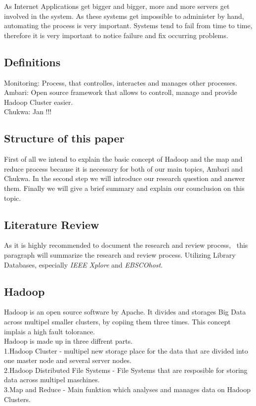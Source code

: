 As Internet Applications get bigger and bigger, more and more servers get involved in the system. As these systems get impossible to administer by hand, automating the process is very important. Systems tend to fail from time to time, therefore it is very important to notice failure and fix occurring problems.


\subsection{Definitions}
Monitoring: Process, that controlles, interactes and manages other processes.
\\
Ambari: Open source framework that allows to controll, manage and provide Hadoop Cluster easier.
\\
Chukwa: Jan !!!

\subsection{Structure of this paper}
First of all we intend to explain the basic concept of Hadoop and  the map and reduce process because it is necessary for both of our main topics, Ambari and Chukwa. In the second step we will introduce our research question and answer them. Finally we will give a brief summary and explain our counclusion on this topic.

\subsection{Literature Review}
	As it is highly recommended to document the research and review process,~\cite{brocke09} this paragraph will summarize the research and review process.
	Utilizing Library Databases, especially \emph{IEEE Xplore} and \emph{EBSCOhost}.
	
\subsection{Hadoop}
Hadoop is an open source software by Apache. It divides and storages Big Data across multipel smaller clusters, by copiing them three times. This concept implais a high fault tolorance. 
 \\
 Hadoop is made up in three diffrent parts. 
  \\
  1.Hadoop Cluster - multipel new storage place for the data that are divided into one master node and several server nodes.
  \\
  2.Hadoop Distributed File Systems - File Systems that are resposible for storing data across multipel maschines.
  \\
  3.Map and Reduce - Main funktion which analyses and manages data on Hadoop Clusters.
